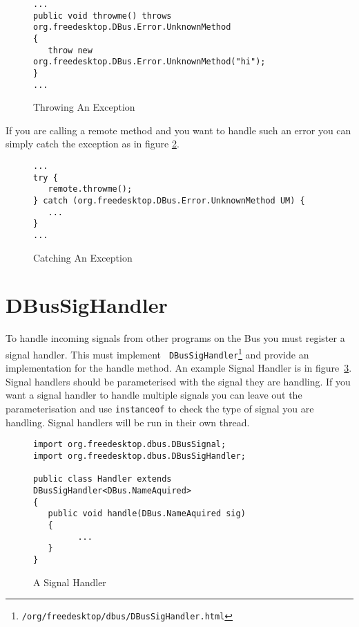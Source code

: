 \documentclass[a4paper,12pt]{article}
\begin{document}
\begin{figure}[htb]
\begin{center}
\begin{verbatim}
...
public void throwme() throws org.freedesktop.DBus.Error.UnknownMethod
{
   throw new org.freedesktop.DBus.Error.UnknownMethod("hi");
}
...
\end{verbatim}
\end{center}
\caption{Throwing An Exception}
\label{fig:exceptioncall}
\end{figure}

If you are calling a remote method and you want to handle such an error you can
simply catch the exception as in figure \ref{fig:exceptioncatch}. 

\begin{figure}[htb]
\begin{center}
\begin{verbatim}
...
try {
   remote.throwme();
} catch (org.freedesktop.DBus.Error.UnknownMethod UM) {
   ...
}
...
\end{verbatim}
\end{center}
\caption{Catching An Exception}
\label{fig:exceptioncatch}
\end{figure}

\section{DBusSigHandler}

To handle incoming signals from other programs on the Bus you must register a
signal handler. This must implement {\tt
DBusSigHandler\footnote{\javadocroot/org/freedesktop/dbus/DBusSigHandler.html}}
and provide an implementation for the handle method. An example Signal Handler
is in figure~\ref{fig:handler}. Signal handlers should be parameterised with
the signal they are handling. If you want a signal handler to handle multiple
signals you can leave out the parameterisation and use {\tt instanceof} to
check the type of signal you are handling. Signal handlers will be run in their
own thread.

\begin{figure}[htb]
\begin{center}
\begin{verbatim}
import org.freedesktop.dbus.DBusSignal;
import org.freedesktop.dbus.DBusSigHandler;

public class Handler extends DBusSigHandler<DBus.NameAquired>
{
   public void handle(DBus.NameAquired sig)
   {
         ...
   }
}
\end{verbatim}
\end{center}
\caption{A Signal Handler}
\label{fig:handler}
\end{figure}
\end{document}
